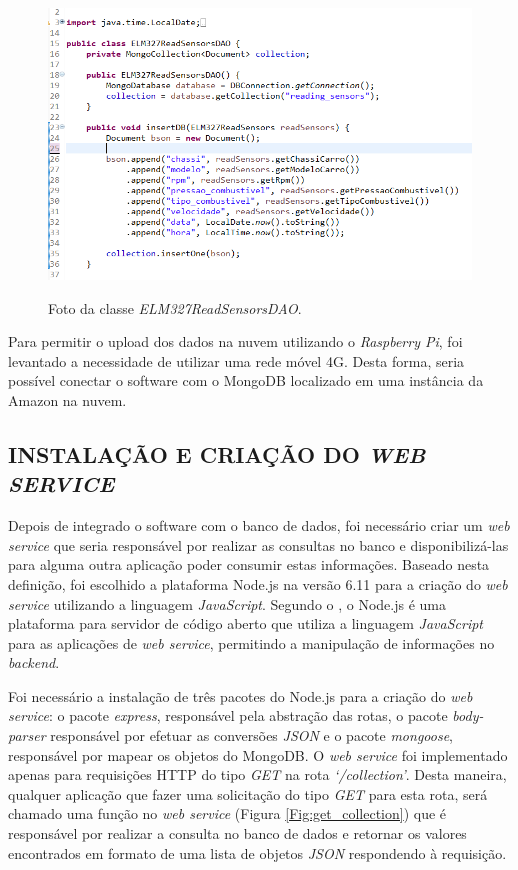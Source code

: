 \begin{figure}[!ht]
\centering
\caption{Foto da classe \textit{ELM327ReadSensorsDAO}.} 
{\includegraphics[scale=.66]{imagens/pacoteDao-ELM327ReadSensorsDAO.png}}\\
 \label{Fig:elm327_read_sensors_dao}
\end{figure}

Para permitir o upload dos dados na nuvem utilizando o \textit{Raspberry Pi}, foi levantado a necessidade de utilizar uma rede móvel 4G. Desta forma, seria possível conectar o software com o MongoDB localizado em uma instância da Amazon na nuvem.

\subsection{INSTALAÇÃO E CRIAÇÃO DO \textit{WEB SERVICE}}
Depois de integrado o software com o banco de dados, foi necessário criar um \textit{web service} que seria responsável por realizar as consultas no banco e disponibilizá-las para alguma outra aplicação poder consumir estas informações. Baseado nesta definição, foi escolhido a plataforma Node.js na versão 6.11 para a criação do \textit{web service} utilizando a linguagem \textit{JavaScript}. Segundo o , o Node.js é uma plataforma para servidor de código aberto que utiliza a linguagem \textit{JavaScript} para as aplicações de \textit{web service}, permitindo a manipulação de informações no \textit{backend}.

Foi necessário a instalação de três pacotes do Node.js para a criação do \textit{web service}: o pacote \textit{express}, responsável pela abstração das rotas, o pacote \textit{body-parser} responsável por efetuar as conversões \textit{JSON} e o pacote \textit{mongoose}, responsável por mapear os objetos do MongoDB. O \textit{web service} foi implementado apenas para requisições HTTP do tipo \textit{GET} na rota \textit{‘/collection’}. Desta maneira, qualquer aplicação que fazer uma solicitação do tipo \textit{GET} para esta rota, será chamado uma função no \textit{web service} (Figura \ref{Fig:get_collection}) que é responsável por realizar a consulta no banco de dados e retornar os valores encontrados em formato de uma lista de objetos \textit{JSON} respondendo à requisição.

